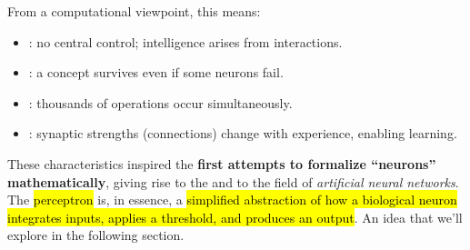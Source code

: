 \highspace
From a computational viewpoint, this means:
\begin{itemize}
    \item {}: no central control; intelligence arises from interactions.
    \item {}: a concept survives even if some neurons fail.
    \item {}: thousands of operations occur simultaneously.
    \item {}: synaptic strengths (connections) change with experience, enabling learning.
\end{itemize}
These characteristics inspired the \textbf{first attempts to formalize ``neurons'' mathematically}, giving rise to the  and to the field of \emph{artificial neural networks}. The \hl{perceptron} is, in essence, a \hl{simplified abstraction of how a biological neuron integrates inputs, applies a threshold, and produces an output}. An idea that we'll explore in the following section.

\newpage

